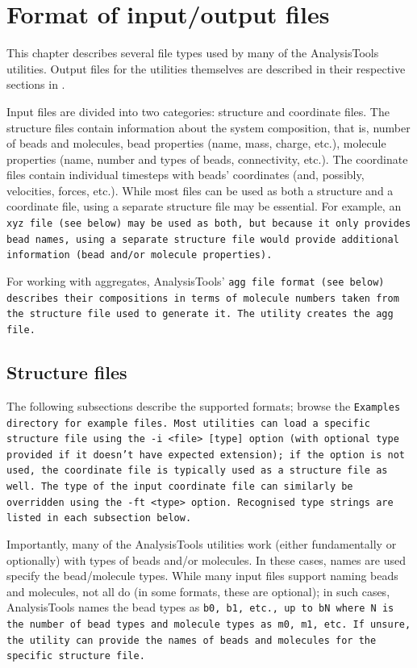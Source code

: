 \chapter{Format of input/output files}\label{chap:input}

This chapter describes several file types used by many of the
AnalysisTools utilities. Output files for the utilities themselves are
described in their respective sections in .

Input files are divided into two categories: structure and coordinate files. The
structure files contain information about the system composition, that is,
number of beads and molecules, bead properties (name, mass, charge, etc.),
molecule properties (name, number and types of beads, connectivity, etc.). The
coordinate files contain individual timesteps with beads' coordinates (and,
possibly, velocities, forces, etc.). While most files can be used as both a
structure and a coordinate file, using a separate structure file may be
essential. For example, an \tt{xyz} file (see below) may be used as both, but
because it only provides bead names, using a separate structure file would
provide additional information (bead and/or molecule properties).

For working with aggregates, AnalysisTools' \tt{agg} file format (see below)
describes their compositions in terms of molecule numbers taken from the
structure file used to generate it. The  utility
creates the \tt{agg} file.

\section{Structure files}\label{sec:StructFile}
The following subsections describe the supported formats; browse the
\tt{Examples} directory for example files. Most utilities can load a specific
structure file using the \tt{-i <file> [type]} option (with optional \tt{type}
provided if it doesn't have expected extension); if the option is not used,
the coordinate file is typically used as a structure file as well. The type of
the input coordinate file can similarly be overridden using the \tt{-ft <type>}
option. Recognised type strings are listed in each subsection below.

Importantly, many of the AnalysisTools utilities work (either fundamentally or
optionally) with types of beads and/or molecules. In these cases, names are used
specify the bead/molecule types. While many input files support naming beads and
molecules, not all do (in some formats, these are optional); in such cases,
AnalysisTools names the bead types as \tt{b0}, \tt{b1}, etc., up to \tt{bN}
where \tt{N} is the number of bead types and molecule types as \tt{m0}, \tt{m1},
etc. If unsure, the  utility can provide the names of beads
and molecules for the specific structure file.

